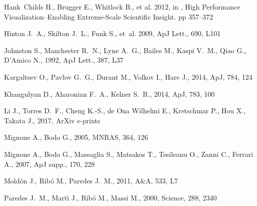 \documentclass[usenatbib]{mn2e}
\newcommand{\mnras}{MNRAS}
\newcommand{\apj}{ApJ}
\newcommand{\apjs}{ApJ supp.}
\newcommand{\apjl}{ApJ Lett.}
\newcommand{\aap}{A\&A}
\begin{document}
\begin{thebibliography}{}
Hank~{Childs} H.,  {Brugger} E.,  {Whitlock} B.,    {et al.} 2012, in , {High
  Performance Visualization--Enabling Extreme-Scale Scientific Insight}.
pp 357--372

{Hinton} J.~A.,  {Skilton} J.~L.,  {Funk} S.,    {et~al.} 2009, \apjl, 690,
  L101

{Johnston} S.,  {Manchester} R.~N.,  {Lyne} A.~G.,  {Bailes} M.,  {Kaspi}
  V.~M.,  {Qiao} G.,    {D'Amico} N.,  1992, \apjl, 387, L37

{Kargaltsev} O.,  {Pavlov} G.~G.,  {Durant} M.,  {Volkov} I.,    {Hare} J.,
  2014, \apj, 784, 124

{Khangulyan} D.,  {Aharonian} F.~A.,    {Kelner} S.~R.,  2014, \apj, 783, 100

{Li} J.,  {Torres} D.~F.,  {Cheng} K.-S.,  {de Ona Wilhelmi} E.,  {Kretschmar}
  P.,  {Hou} X.,    {Takata} J.,  2017, ArXiv e-prints

{Mignone} A.,  {Bodo} G.,  2005, \mnras, 364, 126

{Mignone} A.,  {Bodo} G.,  {Massaglia} S.,  {Matsakos} T.,  {Tesileanu} O.,
  {Zanni} C.,    {Ferrari} A.,  2007, \apjs, 170, 228

{Mold{\'o}n} J.,  {Rib{\'o}} M.,    {Paredes} J.~M.,  2011, \aap, 533, L7

{Paredes} J.~M.,  {Mart{\'{\i}}} J.,  {Rib{\'o}} M.,    {Massi} M.,  2000,
  Science, 288, 2340


\end{thebibliography}
\end{document}
